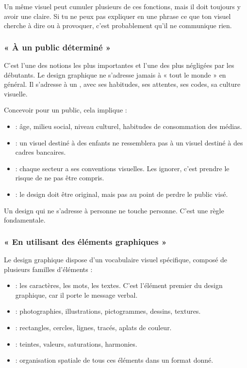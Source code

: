 Un même visuel peut cumuler plusieurs de ces fonctions, mais il doit toujours y avoir une  claire. Si tu ne peux pas expliquer en une phrase ce que ton visuel cherche à dire ou à provoquer, c'est probablement qu'il ne communique rien.

\subsubsection{« À un public déterminé »}

C'est l'une des notions les plus importantes et l'une des plus négligées par les débutants. Le design graphique ne s'adresse jamais à « tout le monde » en général. Il s'adresse à un , avec ses habitudes, ses attentes, ses codes, sa culture visuelle.

Concevoir pour un public, cela implique :

\begin{itemize}
    \item {} : âge, milieu social, niveau culturel, habitudes de consommation des médias.
    \item {} : un visuel destiné à des enfants ne ressemblera pas à un visuel destiné à des cadres bancaires.
    \item {} : chaque secteur a ses conventions visuelles. Les ignorer, c'est prendre le risque de ne pas être compris.
    \item {} : le design doit être original, mais pas au point de perdre le public visé.
\end{itemize}

Un design qui ne s'adresse à personne ne touche personne. C'est une règle fondamentale.

\subsubsection{« En utilisant des éléments graphiques »}

Le design graphique dispose d'un vocabulaire visuel spécifique, composé de plusieurs familles d'éléments :

\begin{itemize}
    \item {} : les caractères, les mots, les textes. C'est l'élément premier du design graphique, car il porte le message verbal.
    \item {} : photographies, illustrations, pictogrammes, dessins, textures.
    \item {} : rectangles, cercles, lignes, tracés, aplats de couleur.
    \item {} : teintes, valeurs, saturations, harmonies.
    \item {} : organisation spatiale de tous ces éléments dans un format donné.
\end{itemize}

